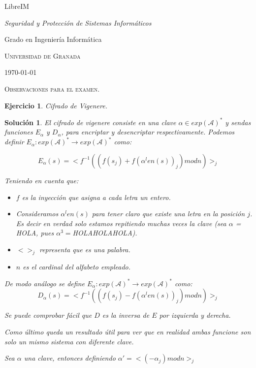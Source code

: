 \documentclass[
  a4paper,
  spanish,
  12pt,
]{scrartcl}
\theoremstyle{ejercicio-style}
\newtheorem{ejer}{Ejercicio}
\theoremstyle{remark-style}
\newtheorem*{sol}{Solución}
\begin{document}
\begin{flushright}
  LibreIM\vspace{.5em}

  \textit{Seguridad y Protección de Sistemas Informáticos}

  Grado en Ingeniería Informática

  \textsc{Universidad de Granada}\vspace{.5em}

  \today\vspace{.5em}
\end{flushright}

\begin{flushleft}
  \scshape\Large Observaciones para el examen.
\end{flushleft}

\begin{ejer}
  Cifrado de Vigenere.
\end{ejer}

\begin{sol}
  El cifrado de vigenere consiste en una clave $\alpha\in exp(\mathcal{A})^*$ y sendas funciones $E_\alpha$ y $D_\alpha$, para encriptar y desencriptar respectivamente. Podemos definir $E_\alpha: exp(\mathcal{A})^* \to exp(\mathcal{A})^*$ como:

  $$ E_\alpha (s) = <f^{-1}( (f(s_j) + f(\alpha^len(s))_j) mod n)>_j$$

  Teniendo en cuenta que:
  \begin{itemize}
  \item $f$ es la inyección que asigna a cada letra un entero.
  \item Consideramos $\alpha^len(s)$ para tener claro que existe una letra en la posición $j$. Es decir en verdad solo estamos repitiendo muchas veces la clave (sea $\alpha$ = HOLA, pues $\alpha^3=$HOLAHOLAHOLA).
  \item $<>_j$ representa que es una palabra.
  \item $n$ es el cardinal del alfabeto empleado.
  \end{itemize}

  De modo análogo se define $E_\alpha: exp(\mathcal{A})^* \to exp(\mathcal{A})^*$ como:
  $$ D_\alpha (s) = <f^{-1}( (f(s_j) - f(\alpha^len(s))_j) mod n)>_j$$

  Se puede comprobar fácil que $D$ es la inversa de $E$ por izquierda y derecha.

  Como último queda un resultado útil para ver que en realidad ambas funcione son solo un mismo sistema con diferente clave.

  Sea $\alpha$ una clave, entonces definiendo $\alpha' = <(-\alpha_j) mod n >_j$
\end{sol}
\end{document}
